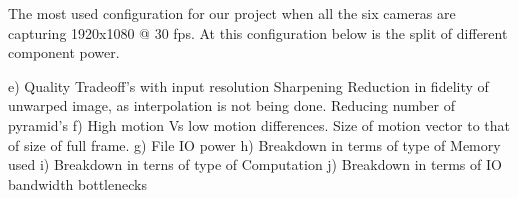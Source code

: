 The most used configuration for our project when all the six cameras are capturing 1920x1080 @ 30 fps. At this configuration below is the split of different component power. \newline


	e) Quality Tradeoff's with input resolution\newline
Sharpening
Reduction in fidelity of unwarped image, as interpolation is not being done.
Reducing number of pyramid's
f) High motion Vs low motion differences. Size of motion vector to that of size of full frame. 
g) File IO power
h) Breakdown in terms of type of Memory	used
i) Breakdown in terns of type of Computation
j) Breakdown in terms of IO bandwidth bottlenecks